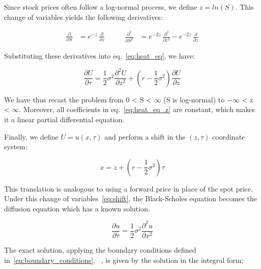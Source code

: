     Since stock prices often follow a log-normal process, we define $z = ln(S)$.
    This change of variables yields the following derivatives:

    \begin{equation*}
        \begin{aligned}
            \frac{\partial}{\partial S} &= e^{-z}\,\frac{\partial}{\partial z}
        \end{aligned}
        \qquad
        \begin{aligned}
            \frac{\partial^2}{\partial S^2} &= e^{-2z}\,\frac{\partial^2}{\partial z^2}
            - e^{-2z}\,\frac{\partial}{\partial z}
        \end{aligned}
    \end{equation*}

    Substituting these derivatives into eq.~\ref{eq:heat_eq}, we have:

    \begin{equation}
        \frac{\partial U}{\partial \tau} =
        \frac{1}{2} \sigma^2 \frac{\partial^2 U}{\partial z^2}
        + \left( r - \frac{1}{2} \sigma^2 \right) \frac{\partial U}{\partial z}
        \label{eq:heat_eq_z}
    \end{equation}

    We have thus recast the problem from 0 < S < $\infty$ (S is log-normal) to $-\infty$ < z < $\infty$. Moreover,
    all coefficients in eq.~\ref{eq:heat_eq_z} are constant, which makes it a linear partial differential equation.

    Finally, we define $U = u(x, \tau)$ and perform a shift in the $(z,\tau)$ coordinate system:

    \begin{equation}
        x = z + \left( r - \frac{1}{2} \sigma^2 \right) \tau
        \label{eq:shift}
    \end{equation}

    This translation is analogous to using a forward price in place of the spot price.
    Under this change of variables~\ref{eq:shift},
    the Black-Scholes equation becomes the diffusion equation which has a known solution.

    \begin{equation}
        \frac{\partial u}{\partial \tau} = \frac{1}{2} \sigma^2 \frac{\partial^2 u}{\partial x^2}
        \label{eq:diffusion_eq}
    \end{equation}

    The exact solution, applying the boundary conditions defined in~\ref{eq:boundary_conditions},
    ~\cite{wilmott_paul_2007}, is given by the solution in the integral form:

